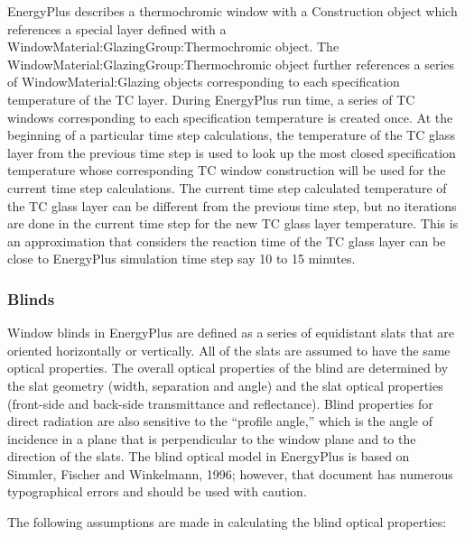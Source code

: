 EnergyPlus describes a thermochromic window with a Construction object which references a special layer defined with a WindowMaterial:GlazingGroup:Thermochromic object. The WindowMaterial:GlazingGroup:Thermochromic object further references a series of WindowMaterial:Glazing objects corresponding to each specification temperature of the TC layer. During EnergyPlus run time, a series of TC windows corresponding to each specification temperature is created once. At the beginning of a particular time step calculations, the temperature of the TC glass layer from the previous time step is used to look up the most closed specification temperature whose corresponding TC window construction will be used for the current time step calculations. The current time step calculated temperature of the TC glass layer can be different from the previous time step, but no iterations are done in the current time step for the new TC glass layer temperature. This is an approximation that considers the reaction time of the TC glass layer can be close to EnergyPlus simulation time step say 10 to 15 minutes.

\subsubsection{Blinds}\label{blinds}

Window blinds in EnergyPlus are defined as a series of equidistant slats that are oriented horizontally or vertically. All of the slats are assumed to have the same optical properties. The overall optical properties of the blind are determined by the slat geometry (width, separation and angle) and the slat optical properties (front-side and back-side transmittance and reflectance). Blind properties for direct radiation are also sensitive to the ``profile angle,'' which is the angle of incidence in a plane that is perpendicular to the window plane and to the direction of the slats. The blind optical model in EnergyPlus is based on Simmler, Fischer and Winkelmann, 1996; however, that document has numerous typographical errors and should be used with caution.

The following assumptions are made in calculating the blind optical properties:

